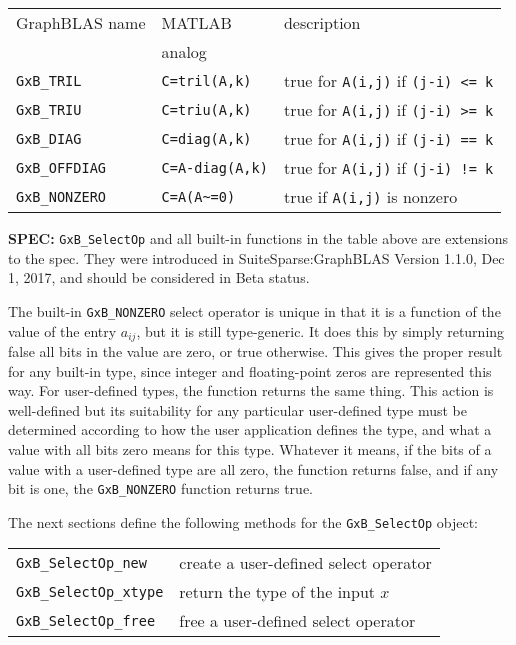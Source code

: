 \documentclass[12pt]{article}
\begin{document}
\vspace{0.2in}
{\footnotesize
\begin{tabular}{lll}
\hline
GraphBLAS name          & MATLAB            & description \\
                        & analog            & \\
\hline
\verb'GxB_TRIL'         & \verb'C=tril(A,k)'   & true for \verb'A(i,j)' if \verb'(j-i) <= k' \\
\verb'GxB_TRIU'         & \verb'C=triu(A,k)'   & true for \verb'A(i,j)' if \verb'(j-i) >= k' \\
\verb'GxB_DIAG'         & \verb'C=diag(A,k)'   & true for \verb'A(i,j)' if \verb'(j-i) == k' \\
\verb'GxB_OFFDIAG'      & \verb'C=A-diag(A,k)' & true for \verb'A(i,j)' if \verb'(j-i) != k' \\
\verb'GxB_NONZERO'      & \verb'C=A(A~=0)'     & true if \verb'A(i,j)' is nonzero\\
\hline
\end{tabular}
}
\vspace{0.2in}

\begin{specbeta}
{\bf SPEC:} \verb'GxB_SelectOp' and all built-in functions in the table above
are extensions to the spec.  They were introduced in SuiteSparse:GraphBLAS
Version 1.1.0, Dec 1, 2017, and should be considered in Beta status.
\end{specbeta}

The built-in \verb'GxB_NONZERO' select operator is unique in that it is a
function of the value of the entry $a_{ij}$, but it is still type-generic.  It
does this by simply returning false all bits in the value are zero, or true
otherwise.  This gives the proper result for any built-in type, since integer
and floating-point zeros are represented this way.  For user-defined types, the
function returns the same thing.  This action is well-defined but its
suitability for any particular user-defined type must be determined according
to how the user application defines the type, and what a value with all bits
zero means for this type.  Whatever it means, if the bits of a value with a
user-defined type are all zero, the function returns false, and if any bit is
one, the \verb'GxB_NONZERO' function returns true.

The next sections define the following methods for the \verb'GxB_SelectOp'
object:

\vspace{0.1in}
{\footnotesize
\begin{tabular}{ll}
\hline
\verb'GxB_SelectOp_new'   & create a user-defined select operator  \\
\verb'GxB_SelectOp_xtype' & return the type of the input $x$ \\
\verb'GxB_SelectOp_free'  & free a user-defined select operator  \\
\hline
\end{tabular}
}
\vspace{0.1in}
\end{document}
